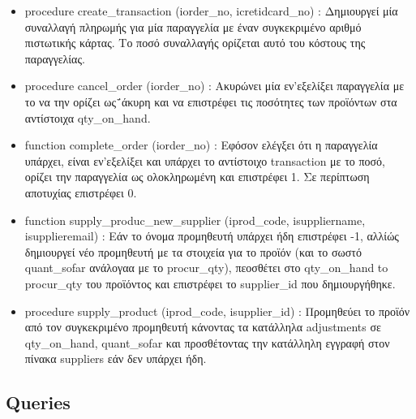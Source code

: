\documentclass[12pt]{article}
\begin{document}
\begin{itemize}
  	  		\item procedure create\_transaction (iorder\_no, icretidcard\_no) : Δημιουργεί μία συναλλαγή πληρωμής για μία παραγγελία με έναν συγκεκριμένο αριθμό πιστωτικής κάρτας. Το ποσό συναλλαγής ορίζεται αυτό του κόστους της παραγγελίας.
  	  		\item procedure cancel\_order (iorder\_no) : Ακυρώνει μία εν'εξελίξει παραγγελία με το να την ορίζει ως΅άκυρη και να επιστρέφει τις ποσότητες των προϊόντων στα αντίστοιχα qty\_on\_hand.
  	  		\item function complete\_order (iorder\_no) : Εφόσον ελέγξει ότι η παραγγελία υπάρχει, είναι εν'εξελίξει και υπάρχει το αντίστοιχο transaction με το ποσό, ορίζει την παραγγελία ως ολοκληρωμένη και επιστρέφει 1. Σε περίπτωση αποτυχίας επιστρέφει 0.
  	  		\item function supply\_produc\_new\_supplier (iprod\_code, isuppliername, isupplieremail) : Εάν το όνομα προμηθευτή υπάρχει ήδη επιστρέφει -1, αλλίώς δημιουργεί νέο προμηθευτή με τα στοιχεία για το προϊόν (και το σωστό quant\_sofar ανάλογαα με το procur\_qty), πεοσθέτει στο qty\_on\_hand to procur\_qty του προϊόντος και επιστρέφει το supplier\_id που δημιουργήθηκε.
  	  		\item procedure supply\_product (iprod\_code, isupplier\_id) : Προμηθεύει το προϊόν από τον συγκεκριμένο προμηθευτή κάνοντας τα κατάλληλα adjustments σε qty\_on\_hand, quant\_sofar και προσθέτοντας την κατάλληλη εγγραφή στον πίνακα suppliers εάν δεν υπάρχει ήδη.
  	  	\end{itemize}
  	\subsection{Queries}
  	  \paragraph{}
  	  	 	 	
\end{document}
